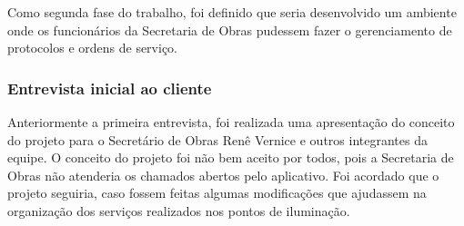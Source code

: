 \documentclass[
	article,			%
	11pt,				%
	oneside,			%
	a4paper,			%
	english,			%
	brazil,				%
	sumario=tradicional
	]{abntex2}
\begin{document}
Como segunda fase do trabalho, foi definido que seria desenvolvido um ambiente onde os funcionários da Secretaria de Obras pudessem fazer o gerenciamento de protocolos e ordens de serviço.

\subsubsection{Entrevista inicial ao cliente}

Anteriormente a primeira entrevista, foi realizada uma apresentação do conceito do projeto para o Secretário de Obras Renê Vernice e outros integrantes da equipe.
O conceito do projeto foi não bem aceito por todos, pois a Secretaria de Obras não atenderia os chamados abertos pelo aplicativo.
Foi acordado que o projeto seguiria, caso fossem feitas algumas modificações que ajudassem na organização dos serviços realizados nos pontos de iluminação.
\end{document}
